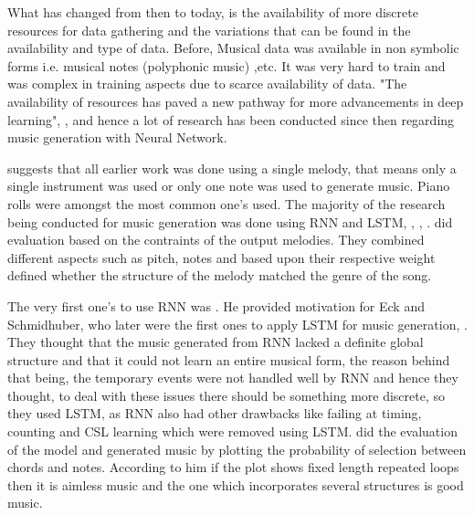 \documentclass[oneside,12pt]{Classes/RoboticsLaTeX}
\begin{document}
What has changed from then to today, is the availability of more discrete resources for data gathering and the variations that can be found in the availability and type of data. Before, Musical data was available in non symbolic forms i.e. musical notes (polyphonic music) ,etc. It was very hard to train and was complex in training aspects due to scarce availability of data. "The availability of resources has paved a new pathway for more advancements in deep learning", \cite{deeplearning}, and hence a lot of research has been conducted since then regarding music generation with Neural Network.

\cite{jpon} suggests that all earlier work was done using a single melody, that means only a single instrument was used or only one note was used to generate music. Piano rolls were amongst the most common one's used. The majority  of the research being conducted for music generation was done using RNN and LSTM,  \cite{lstmtemporal}, \cite{rnnmelodies}, \cite{eck}. \cite{rnnmelodies} did evaluation based on the contraints of the output melodies. They combined different aspects such as pitch, notes and based upon their respective weight defined whether the structure of the melody matched the genre of the song.

The very first one's to use RNN was \cite{mozer}. He provided motivation for Eck and Schmidhuber, who later were the first ones to apply LSTM for music generation, \cite{eckschmid}. They thought that the music generated from RNN lacked a definite global structure and that it could not learn an entire musical form, the reason behind that being, the temporary events were not handled well by RNN and hence they thought, to deal with these issues there should be something more discrete, so they used LSTM, as RNN also had other drawbacks like failing at timing, counting and CSL learning which were removed using LSTM. \cite{eck} did the evaluation of the model and generated music by plotting the probability of selection between chords and notes. According to him if the plot shows fixed length repeated loops then it is aimless music and the one which incorporates several structures is good music.
\end{document}
